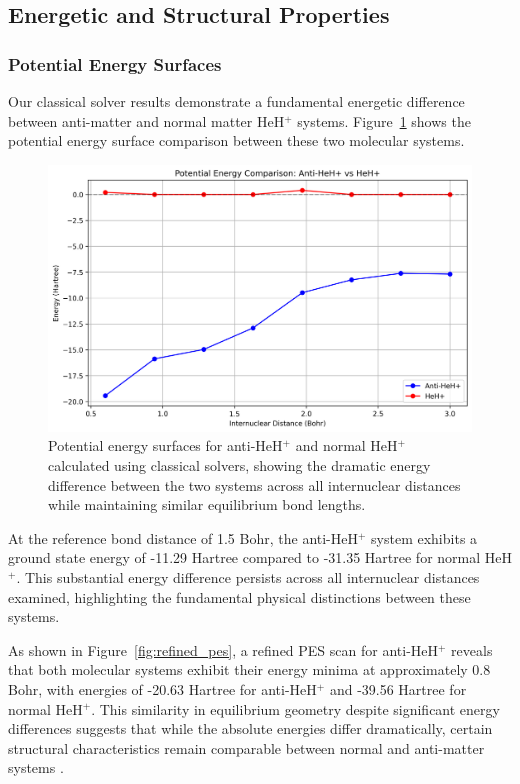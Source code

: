 \documentclass[10pt,twocolumn,a4paper]{article}
\begin{document}
\subsection{Energetic and Structural Properties}

\subsubsection{Potential Energy Surfaces}
Our classical solver results demonstrate a fundamental energetic difference between anti-matter and normal matter HeH$^+$ systems. Figure~\ref{fig:pes_comparison} shows the potential energy surface comparison between these two molecular systems.

\begin{figure}[t!]
    \centering
    \includegraphics[width=\columnwidth]{graphs/corrected_comparison_pes.png}
    \caption{Potential energy surfaces for anti-HeH$^+$ and normal HeH$^+$ calculated using classical solvers, showing the dramatic energy difference between the two systems across all internuclear distances while maintaining similar equilibrium bond lengths.}
    \label{fig:pes_comparison}
\end{figure}

At the reference bond distance of 1.5 Bohr, the anti-HeH$^+$ system exhibits a ground state energy of -11.29 Hartree compared to -31.35 Hartree for normal HeH$^+$. This substantial energy difference persists across all internuclear distances examined, highlighting the fundamental physical distinctions between these systems.

As shown in Figure~\ref{fig:refined_pes}, a refined PES scan for anti-HeH$^+$ reveals that both molecular systems exhibit their energy minima at approximately 0.8 Bohr, with energies of -20.63 Hartree for anti-HeH$^+$ and -39.56 Hartree for normal HeH$^+$. This similarity in equilibrium geometry despite significant energy differences suggests that while the absolute energies differ dramatically, certain structural characteristics remain comparable between normal and anti-matter systems \cite{chardonnet2021theoretical}.
\end{document}
